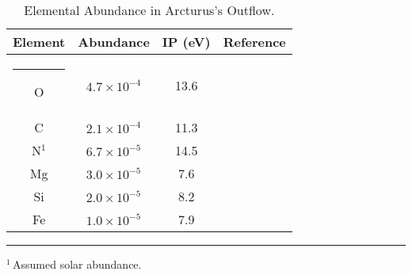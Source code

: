 \begin{table}[!ht]
\begin{center}
\caption[Elemental Abundance in Arcturus's Outflow]{Elemental Abundance in Arcturus's Outflow.}
\begin{tabular}{cccc}
\hline
\hline
\rule{0pt}{2.5ex} Element & Abundance & IP (eV) & Reference \\
\hline
\rule{-2.5pt}{2.5ex}	O &  $4.7\times 10^{-4}$ & 13.6 & \cite{ramirez_2011}\\
					C &  $2.1\times 10^{-4}$ & 11.3 & \cite{ramirez_2011}\\
					N$^{1}$ &  $6.7\times 10^{-5}$& 14.5 & \cite{asplund_2009}\\
					Mg & $3.0\times 10^{-5}$ & 7.6 & \cite{ramirez_2011}\\
					Si & $2.0\times 10^{-5}$ & 8.2 & \cite{ramirez_2011}\\
					Fe & $1.0\times 10^{-5}$ & 7.9 & \cite{decin_2003}\\
\hline
\end{tabular}
\label{tab:7.1}
\begin{minipage}{12.5cm}
\rule{-2.5pt}{2.5ex}{\footnotesize $^{1}$\,Assumed solar abundance.}
\end{minipage}
\end{center}
\end{table}

